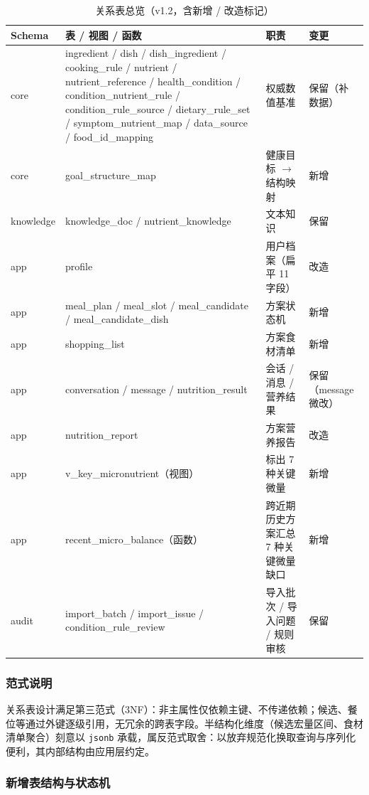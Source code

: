 \documentclass[12pt,a4paper]{ctexart}
\begin{document}
{\small\setlength{\tabcolsep}{4pt}\begin{xltabular}{\linewidth}{p{2.2cm}Q{5.4cm}Lp{2.4cm}}
\caption{关系表总览（v1.2，含新增 / 改造标记）} \\
\toprule
\textbf{Schema} & \textbf{表 / 视图 / 函数} & \textbf{职责} & \textbf{变更} \\
\midrule
\endhead
core & ingredient / dish / dish\_ingredient / cooking\_rule / nutrient / nutrient\_reference / health\_condition / condition\_nutrient\_rule / condition\_rule\_source / dietary\_rule\_set / symptom\_nutrient\_map / data\_source / food\_id\_mapping & 权威数值基准 & 保留（补数据） \\
core & goal\_structure\_map & 健康目标 $\rightarrow$ 结构映射 & 新增 \\
knowledge & knowledge\_doc / nutrient\_knowledge & 文本知识 & 保留 \\
app & profile & 用户档案（扁平 11 字段） & 改造 \\
app & meal\_plan / meal\_slot / meal\_candidate / meal\_candidate\_dish & 方案状态机 & 新增 \\
app & shopping\_list & 方案食材清单 & 新增 \\
app & conversation / message / nutrition\_result & 会话 / 消息 / 营养结果 & 保留（message 微改） \\
app & nutrition\_report & 方案营养报告 & 改造 \\
app & v\_key\_micronutrient（视图） & 标出 7 种关键微量 & 新增 \\
app & recent\_micro\_balance（函数） & 跨近期历史方案汇总 7 种关键微量缺口 & 新增 \\
audit & import\_batch / import\_issue / condition\_rule\_review & 导入批次 / 导入问题 / 规则审核 & 保留 \\
\bottomrule
\end{xltabular}}

\subsubsection{范式说明}

关系表设计满足第三范式（3NF）：非主属性仅依赖主键、不传递依赖；候选、餐位等通过外键逐级引用，无冗余的跨表字段。半结构化维度（候选宏量区间、食材清单聚合）刻意以 \texttt{jsonb} 承载，属反范式取舍：以放弃规范化换取查询与序列化便利，其内部结构由应用层约定。

\subsubsection{新增表结构与状态机}
\end{document}
